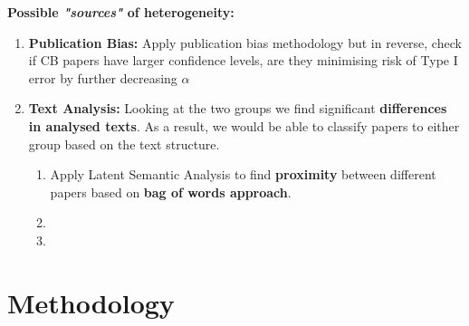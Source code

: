 \documentclass{article}
\begin{document}
\textbf{Possible \textit{"sources"} of heterogeneity:}
\begin{enumerate}
 \item \textbf{Publication Bias:} Apply publication bias methodology but in reverse, check if CB papers have larger confidence levels, are they minimising risk of Type I error by further decreasing $\alpha$
    \item \textbf{Text Analysis:} Looking at the two groups we find significant \textbf{differences in analysed texts}. As a result, we would be able to classify papers to either group based on the text structure.
        \begin{enumerate}
            \item Apply Latent Semantic Analysis to find \textbf{proximity} between different papers based on \textbf{bag of words approach}.
             \item
             \item
        \end{enumerate}
\end{enumerate}

\newpage

\section{Methodology}
\end{document}

